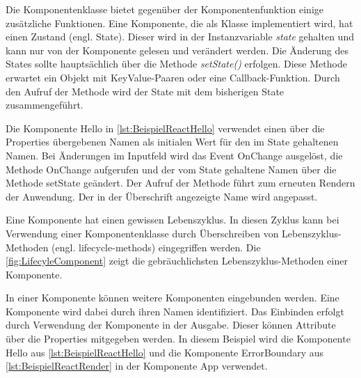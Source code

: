 
Die Komponentenklasse bietet gegenüber der Komponentenfunktion einige zusätzliche Funktionen. Eine  Komponente, die als Klasse implementiert wird, hat einen Zustand (engl. State). Dieser wird in der Instanzvariable \textit{state} gehalten und kann nur von der Komponente gelesen und verändert werden. Die Änderung des States sollte hauptsächlich über die Methode \textit{setState()} erfolgen. Diese Methode  erwartet ein Objekt mit KeyValue-Paaren oder eine Callback-Funktion. Durch den Aufruf der Methode wird der State mit dem bisherigen State zusammengeführt.\autocites[vgl.][24\psq,89-93]{Zeigermann.2016}[vgl.][17\psq]{Stefanov.2017} 

Die Komponente Hello in \autoref{lst:BeispielReactHello} verwendet einen über die Properties übergebenen Namen als initialen Wert für den im State gehaltenen Namen. Bei Änderungen im Inputfeld wird das Event OnChange ausgelöst, die Methode OnChange aufgerufen und der vom State gehaltene Namen über die Methode setState geändert. Der Aufruf der Methode führt zum erneuten Rendern der Anwendung. Der in der Überschrift angezeigte Name wird angepasst.

Eine Komponente hat einen gewissen Lebenszyklus. In diesen Zyklus kann bei Verwendung einer Komponentenklasse durch Überschreiben von Lebenszyklus-Methoden (engl. lifecycle-methods) eingegriffen werden. Die \autoref{fig:LifecyleComponent} zeigt die gebräuchlichsten Lebenszyklus-Methoden einer Komponente.\autocites[vgl.][96-100]{Zeigermann.2016}[vgl.][]{Facebook.2018b}

In einer Komponente können weitere Komponenten eingebunden werden. Eine Komponente wird dabei durch ihren Namen identifiziert. Das Einbinden erfolgt durch Verwendung der Komponente in der Ausgabe. Dieser können Attribute über die Properties mitgegeben werden.\autocites[vgl.][111\psqq]{Zeigermann.2016} In diesem Beispiel wird die Komponente Hello aus \autoref{lst:BeispielReactHello}  und die Komponente ErrorBoundary aus \autoref{lst:BeispielReactRender} in der Komponente App verwendet. 

